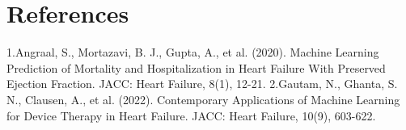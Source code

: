 \documentclass[
  journal=medium,
  manuscript=article-type,
  year=2026,
  volume=37,
]{cup-journal}
\begin{document}
\printendnotes


\printbibliography[prenote={preamble}]
\appendix

\section{References}
1.Angraal, S., Mortazavi, B. J., Gupta, A., et al. (2020). Machine Learning Prediction of Mortality and Hospitalization in Heart Failure With Preserved Ejection Fraction. JACC: Heart Failure, 8(1), 12-21.
\newline2.Gautam, N., Ghanta, S. N., Clausen, A., et al. (2022). Contemporary Applications of Machine Learning for Device Therapy in Heart Failure. JACC: Heart Failure, 10(9), 603-622. 
\end{document}
